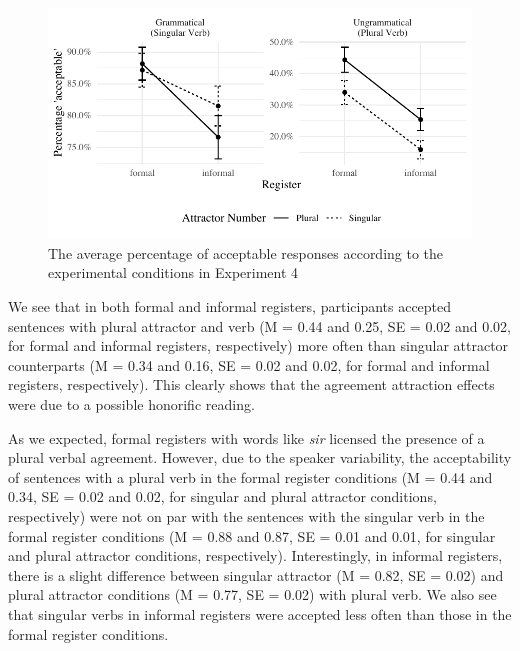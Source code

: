 \begin{knitrout}
\color{fgcolor}\begin{figure}[hbt!]

{\centering \includegraphics[width=\linewidth]{figure/exp4AvgResponse-1} 

}

\caption{The average percentage of acceptable responses according to the experimental conditions in Experiment 4}\label{fig:exp4AvgResponse}
\end{figure}

\end{knitrout}

We see that in both formal and informal registers, participants accepted sentences with plural attractor and verb (M = 0.44 and 0.25, SE = 0.02 and 0.02, for formal and informal registers, respectively) more often than singular attractor counterparts (M = 0.34 and 0.16, SE = 0.02 and 0.02, for formal and informal registers, respectively). This clearly shows that the agreement attraction effects were due to a possible honorific reading. 

As we expected, formal registers with words like \emph{sir} licensed the presence of a plural verbal agreement. However, due to the speaker variability, the acceptability of sentences with a plural verb in the formal register conditions (M = 0.44 and 0.34, SE = 0.02 and 0.02, for singular and plural attractor conditions, respectively) were not on par with the sentences with the singular verb in the formal register conditions (M = 0.88 and 0.87, SE = 0.01 and 0.01, for singular and plural attractor conditions, respectively). Interestingly, in informal registers, there is a slight difference between singular attractor (M = 0.82, SE = 0.02) and plural attractor conditions (M = 0.77, SE = 0.02) with plural verb. We also see that singular verbs in informal registers were accepted less often than those in the formal register conditions. 

